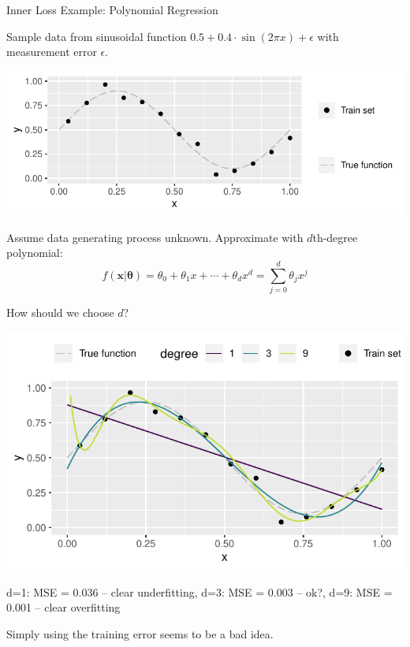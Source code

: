     \begin{frame}[c,allowframebreaks]{Inner Loss Example: Polynomial Regression}

    Sample data from sinusoidal function
    $0.5 + 0.4 \cdot \sin (2 \pi x) + \epsilon$
    with measurement error $\epsilon$.

    \begin{center}
    \includegraphics[width=.7\textwidth]{images/poly}
    \end{center}

    Assume data generating process unknown.
    Approximate with $d$th-degree polynomial:
    \[ f(\mathbf{x} | \mathbf{\theta}) = \theta_0 + \theta_1 x + \cdots + \theta_d x^d = \sum_{j = 0}^{d} \theta_j x^j \]

    \framebreak

    How should we choose $d$?

    \begin{center}
    \includegraphics[width=.5\textwidth]{images/poly-train}
    \end{center}

    d=1: MSE = 0.036 -- clear underfitting,
    d=3: MSE = 0.003 -- ok?,
    d=9: MSE = 0.001 -- clear overfitting

    Simply using the training error seems to be a bad idea.

    \end{frame}

